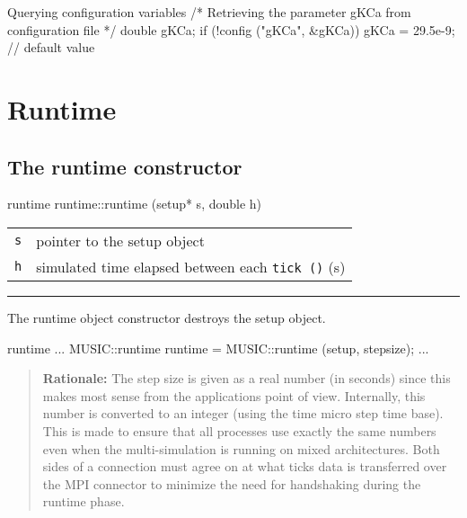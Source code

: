 \documentclass[a4paper]{report}
\makeatletter
\newenvironment{rationale}%
{\par\begin{quote}\textbf{Rationale:}}%
{\par\end{quote}}
\newenvironment{parameters}%
{\begin{tabular}{@{\hspace{2em}}lp{0.6\textwidth}}}%
{\end{tabular}\par\vspace{1mm}\par\hrule\par\vspace{5mm}}
\makeatother
\begin{document}
\begin{code}{Querying configuration variables}
/* Retrieving the parameter gKCa
   from configuration file */
double gKCa;
if (!config ("gKCa", &gKCa))
  gKCa = 29.5e-9; // default value
\end{code}

\section{Runtime}

\subsection{The runtime constructor}

\begin{head}{runtime}
  runtime::runtime (setup* s, double h)
\end{head}
\begin{parameters}
  \lstinline|s| & pointer to the setup object \\
  \lstinline|h| & simulated time elapsed between each \lstinline|tick ()| (s) \\
\end{parameters}

The runtime object constructor destroys the setup object.

\begin{code}{runtime}
  ...
  MUSIC::runtime runtime = MUSIC::runtime (setup, stepsize);
  ...
\end{code}

\begin{rationale}
  The step size is given as a real number (in seconds) since this
  makes most sense from the applications point of view.  Internally,
  this number is converted to an integer (using the time micro step
  time base).  This is made to ensure that all processes use exactly
  the same numbers even when the multi-simulation is running on mixed
  architectures.  Both sides of a connection must agree on at what
  ticks data is transferred over the MPI connector to minimize the
  need for handshaking during the runtime phase.
\end{rationale}
\end{document}
